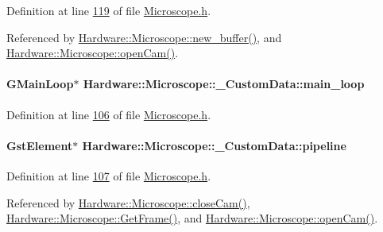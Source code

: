 Definition at line \hyperlink{_microscope_8h_source_l00119}{119} of file \hyperlink{_microscope_8h_source}{Microscope.\+h}.



Referenced by \hyperlink{_microscope_8cpp_source_l00413}{Hardware\+::\+Microscope\+::new\+\_\+buffer()}, and \hyperlink{_microscope_8cpp_source_l00167}{Hardware\+::\+Microscope\+::open\+Cam()}.

\hypertarget{struct_hardware_1_1_microscope_1_1___custom_data_ae91d22ab690eff7f086d4fc6fdda7e50}{}
\paragraph[{main\+\_\+loop}]{\setlength{\rightskip}{0pt plus 5cm}G\+Main\+Loop$\ast$ Hardware\+::\+Microscope\+::\+\_\+\+Custom\+Data\+::main\+\_\+loop}\label{struct_hardware_1_1_microscope_1_1___custom_data_ae91d22ab690eff7f086d4fc6fdda7e50}


Definition at line \hyperlink{_microscope_8h_source_l00106}{106} of file \hyperlink{_microscope_8h_source}{Microscope.\+h}.

\hypertarget{struct_hardware_1_1_microscope_1_1___custom_data_aaf39f1862740897f67661ac21e22cc5d}{}
\paragraph[{pipeline}]{\setlength{\rightskip}{0pt plus 5cm}Gst\+Element$\ast$ Hardware\+::\+Microscope\+::\+\_\+\+Custom\+Data\+::pipeline}\label{struct_hardware_1_1_microscope_1_1___custom_data_aaf39f1862740897f67661ac21e22cc5d}


Definition at line \hyperlink{_microscope_8h_source_l00107}{107} of file \hyperlink{_microscope_8h_source}{Microscope.\+h}.



Referenced by \hyperlink{_microscope_8cpp_source_l00311}{Hardware\+::\+Microscope\+::close\+Cam()}, \hyperlink{_microscope_8cpp_source_l00319}{Hardware\+::\+Microscope\+::\+Get\+Frame()}, and \hyperlink{_microscope_8cpp_source_l00167}{Hardware\+::\+Microscope\+::open\+Cam()}.

